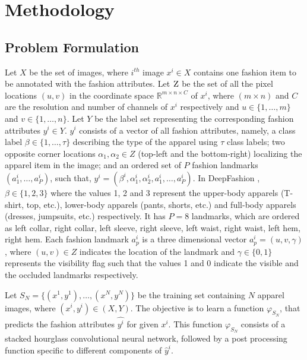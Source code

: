 \documentclass[conference]{IEEEtran}
\begin{document}
\section{Methodology}

\subsection{Problem Formulation}
Let $X$ be the set of images, where $i^{th}$ image $x^i \in X$ contains one fashion item to be annotated with the fashion attributes. Let $\textsc{Z}$  be the set of all the pixel locations $(u,v)$ in the coordinate space $\mathbb{R}^{m \times n \times C}$ of $x^i$, where $(m \times n)$ and $C$ are the resolution and number of channels of $x^i$ respectively and $u \in \{1, \ldots, m\}$ and $v \in \{1, \ldots, n\}$. Let $Y$ be the label set representing the corresponding fashion attributes $y^i \in Y$. $y^i$ consists of a vector of all fashion attributes, namely, a class label $\beta \in \{1, \dots, \tau\}$ describing the type of the apparel using $\tau$ class labels; two opposite corner locations $\alpha_1, \alpha_2 \in Z$ (top-left and the bottom-right) localizing the apparel item in the image; and an ordered set of $P$ fashion landmarks $(a^i_1, \dots ,a^i_P)$, such that, $y^i = (\beta^i, \alpha^i_1, \alpha^i_2, a^i_1, \dots ,a^i_P)$. In DeepFashion \cite{liu2016deepfashion}, $\beta \in \{1,2,3\}$ where the values 1, 2 and 3 represent the upper-body apparels (T-shirt, top, etc.), lower-body apparels (pants, shorts, etc.) and full-body apparels (dresses, jumpsuits, etc.) respectively. It has $P=8$ landmarks, which are ordered as left collar, right collar, left sleeve, right sleeve, left waist, right waist, left hem, right hem. Each fashion landmark $a^i_p$  is a three dimensional vector $a^i_p = (u,v,\gamma)$, where $(u,v) \in Z$ indicates the location of the landmark and $\gamma \in \{0,1\}$ represents the visibility flag such that the values 1 and 0 indicate the visible and the occluded landmarks respectively. 


Let $S_N = \{(x^1, y^1), \dots, (x^N, y^N)\}$ be the training set containing $N$ apparel images, where $(x^i,y^i) \in (X, Y)$. The objective is to learn a function $\varphi_{S_N}$, that predicts the fashion attributes $\hat{y^i}$ for given $x^i$. This function $\varphi_{S_N}$ consists of a stacked hourglass convolutional neural network, followed by a post processing function  specific to different components of $\hat{y}^i$.
\end{document}
